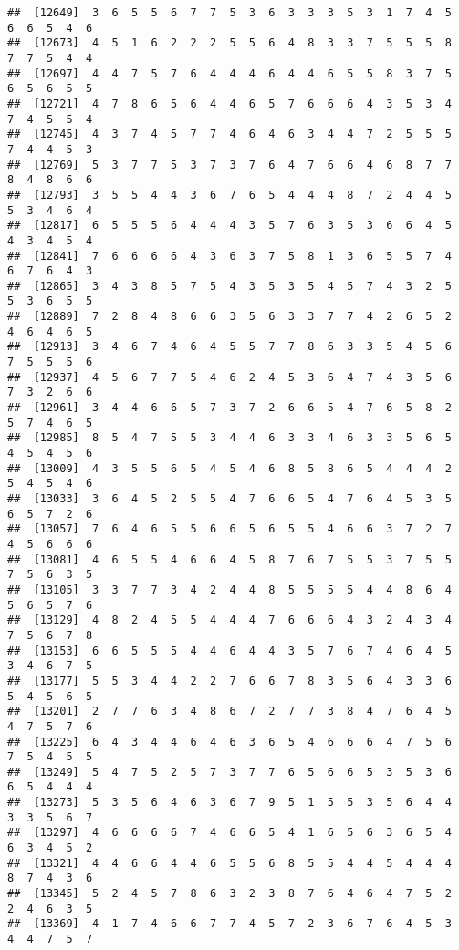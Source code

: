 \documentclass[
]{book}
\begin{document}
\begin{verbatim}
##  [12649]  3  6  5  5  6  7  7  5  3  6  3  3  3  5  3  1  7  4  5  6  6  5  4  6
##  [12673]  4  5  1  6  2  2  2  5  5  6  4  8  3  3  7  5  5  5  8  7  7  5  4  4
##  [12697]  4  4  7  5  7  6  4  4  4  6  4  4  6  5  5  8  3  7  5  6  5  6  5  5
##  [12721]  4  7  8  6  5  6  4  4  6  5  7  6  6  6  4  3  5  3  4  7  4  5  5  4
##  [12745]  4  3  7  4  5  7  7  4  6  4  6  3  4  4  7  2  5  5  5  7  4  4  5  3
##  [12769]  5  3  7  7  5  3  7  3  7  6  4  7  6  6  4  6  8  7  7  8  4  8  6  6
##  [12793]  3  5  5  4  4  3  6  7  6  5  4  4  4  8  7  2  4  4  5  5  3  4  6  4
##  [12817]  6  5  5  5  6  4  4  4  3  5  7  6  3  5  3  6  6  4  5  4  3  4  5  4
##  [12841]  7  6  6  6  6  4  3  6  3  7  5  8  1  3  6  5  5  7  4  6  7  6  4  3
##  [12865]  3  4  3  8  5  7  5  4  3  5  3  5  4  5  7  4  3  2  5  5  3  6  5  5
##  [12889]  7  2  8  4  8  6  6  3  5  6  3  3  7  7  4  2  6  5  2  4  6  4  6  5
##  [12913]  3  4  6  7  4  6  4  5  5  7  7  8  6  3  3  5  4  5  6  7  5  5  5  6
##  [12937]  4  5  6  7  7  5  4  6  2  4  5  3  6  4  7  4  3  5  6  7  3  2  6  6
##  [12961]  3  4  4  6  6  5  7  3  7  2  6  6  5  4  7  6  5  8  2  5  7  4  6  5
##  [12985]  8  5  4  7  5  5  3  4  4  6  3  3  4  6  3  3  5  6  5  4  5  4  5  6
##  [13009]  4  3  5  5  6  5  4  5  4  6  8  5  8  6  5  4  4  4  2  5  4  5  4  6
##  [13033]  3  6  4  5  2  5  5  4  7  6  6  5  4  7  6  4  5  3  5  6  5  7  2  6
##  [13057]  7  6  4  6  5  5  6  6  5  6  5  5  4  6  6  3  7  2  7  4  5  6  6  6
##  [13081]  4  6  5  5  4  6  6  4  5  8  7  6  7  5  5  3  7  5  5  7  5  6  3  5
##  [13105]  3  3  7  7  3  4  2  4  4  8  5  5  5  5  4  4  8  6  4  5  6  5  7  6
##  [13129]  4  8  2  4  5  5  4  4  4  7  6  6  6  4  3  2  4  3  4  7  5  6  7  8
##  [13153]  6  6  5  5  5  4  4  6  4  4  3  5  7  6  7  4  6  4  5  3  4  6  7  5
##  [13177]  5  5  3  4  4  2  2  7  6  6  7  8  3  5  6  4  3  3  6  5  4  5  6  5
##  [13201]  2  7  7  6  3  4  8  6  7  2  7  7  3  8  4  7  6  4  5  4  7  5  7  6
##  [13225]  6  4  3  4  4  6  4  6  3  6  5  4  6  6  6  4  7  5  6  7  5  4  5  5
##  [13249]  5  4  7  5  2  5  7  3  7  7  6  5  6  6  5  3  5  3  6  6  5  4  4  4
##  [13273]  5  3  5  6  4  6  3  6  7  9  5  1  5  5  3  5  6  4  4  3  3  5  6  7
##  [13297]  4  6  6  6  6  7  4  6  6  5  4  1  6  5  6  3  6  5  4  6  3  4  5  2
##  [13321]  4  4  6  6  4  4  6  5  5  6  8  5  5  4  4  5  4  4  4  8  7  4  3  6
##  [13345]  5  2  4  5  7  8  6  3  2  3  8  7  6  4  6  4  7  5  2  2  4  6  3  5
##  [13369]  4  1  7  4  6  6  7  7  4  5  7  2  3  6  7  6  4  5  3  4  4  7  5  7

\end{verbatim}
\end{document}
